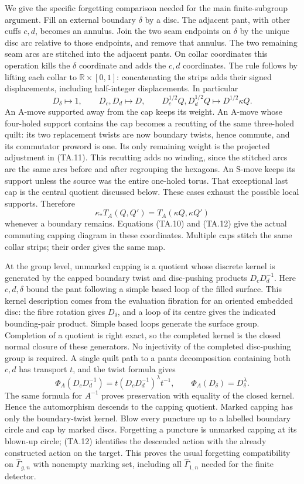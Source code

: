 We give the specific forgetting comparison needed for the main
finite-subgroup argument.  Fill an external boundary $\delta$ by a
disc.  The adjacent pant, with other cuffs $c,d$, becomes an annulus.
Join the two seam endpoints on $\delta$ by the unique disc arc relative
to those endpoints, and remove that annulus.  The two remaining seam
arcs are stitched into the adjacent pants.  On collar coordinates this
operation kills the $\delta$ coordinate and adds the $c,d$ coordinates.
The rule follows by lifting each collar to
$\mathbb R\times[0,1]$: concatenating the strips adds their signed
displacements, including half-integer displacements.  In particular
\[
 D_\delta\mapsto1,\qquad D_c,D_d\mapsto D,
 \qquad D_c^{1/2}Q,D_d^{1/2}Q\mapsto D^{1/2}\kappa Q.
                                                               \tag{TA.11}
\]
An A-move supported away from the cap keeps its weight.  An A-move
whose four-holed support contains the cap becomes a recutting of the
same three-holed quilt: its two replacement twists are now boundary
twists, hence commute, and its commutator proword is one.  Its only
remaining weight is the projected adjustment in (TA.11).  This
recutting adds no winding, since the stitched arcs are the same arcs
before and after regrouping the hexagons.  An S-move keeps its support
unless the source was the entire one-holed torus.  That exceptional
last cap is the central quotient discussed below.  These cases exhaust
the possible local supports.  Therefore
\[
       \kappa_*T_A(Q,Q')=T_A(\kappa Q,\kappa Q')              \tag{TA.12}
\]
whenever a boundary remains.  Equations (TA.10) and (TA.12) give the
actual commuting capping diagram in these coordinates.  Multiple
caps stitch the same collar strips; their order gives the same map.

At the group level, unmarked capping is a quotient whose discrete
kernel is generated by the capped boundary twist and disc-pushing
products $D_cD_d^{-1}$.  Here $c,d,\delta$ bound the pant following
a simple based loop of the filled surface.  This kernel description
comes from the evaluation fibration for an oriented embedded disc:
the fibre rotation gives $D_\delta$, and a loop of its centre gives
the indicated bounding-pair product.  Simple based loops generate
the surface group.  Completion of a quotient is right exact, so the
completed kernel is the closed normal closure of these generators.
No injectivity of the completed disc-pushing group is required.
A single quilt path to a pants decomposition containing both $c,d$
has transport $t$, and the twist formula gives
\[
 \Phi_A(D_cD_d^{-1})=t(D_cD_d^{-1})^\lambda t^{-1},\qquad
 \Phi_A(D_\delta)=D_\delta^\lambda.                         \tag{TA.13}
\]
The same formula for $A^{-1}$ proves preservation with equality of
the closed kernel.  Hence the automorphism descends to the capping
quotient.  Marked capping has only the boundary-twist kernel.
Blow every puncture up to a labelled boundary circle and cap by marked
discs.  Forgetting a puncture is unmarked capping at its blown-up circle;
(TA.12) identifies the descended action with the already constructed
action on the target.  This proves the usual forgetting compatibility
on $\widehat\Gamma_{g,n}$ with nonempty marking set, including all
$\widehat\Gamma_{1,n}$ needed for the finite detector.

